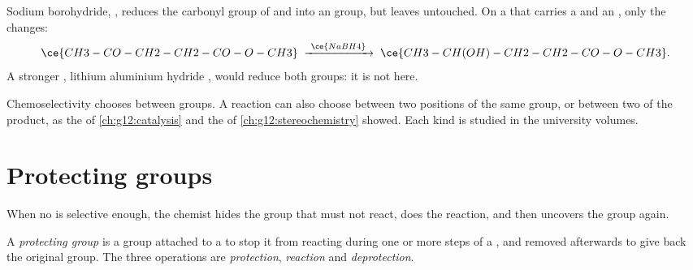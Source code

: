 \begin{example}\label{ex:g12:synthesis-strategy:nabh4}
Sodium borohydride, , reduces the carbonyl group of 
and  into an  group, but leaves  untouched. On a
 that carries a  and an , only the  changes:
\[
  \ce{CH3-CO-CH2-CH2-CO-O-CH3}
  \;\xrightarrow{\ \ce{NaBH4}\ }\;
  \ce{CH3-CH(OH)-CH2-CH2-CO-O-CH3} .
\]
A stronger , lithium aluminium hydride , would reduce
both groups: it is not  here.
\end{example}

\begin{remark}\label{rem:g12:synthesis-strategy:kinds}
Chemoselectivity chooses between groups. A reaction can also choose
between two positions of the same group, or between two  of
the product, as the  of \cref{ch:g12:catalysis} and the 
 of \cref{ch:g12:stereochemistry} showed. Each kind is studied
in the university volumes.
\end{remark}

\section{Protecting groups}

When no  is selective enough, the chemist hides the group that
must not react, does the reaction, and then uncovers the group again.

\begin{definition}\label{def:g12:synthesis-strategy:protecting-group}
A \emph{protecting group} is a group attached to a
 to stop it from reacting during one or more steps of a
, and removed afterwards to give back the original group. The
three operations are \emph{protection}, \emph{reaction} and
\emph{deprotection}.
\end{definition}

